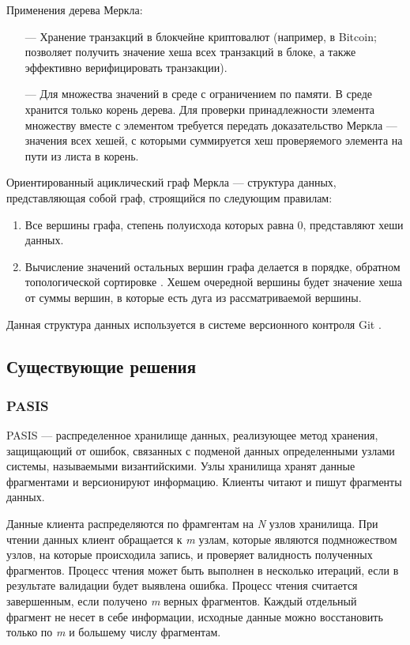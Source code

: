 Применения дерева Меркла:
\begin{itemize}
	\item[---] Хранение транзакций в блокчейне криптовалют (например, в Bitcoin; позволяет получить значение хеша всех транзакций в блоке, а также эффективно верифицировать транзакции).
	\item[---] Для множества значений в среде с ограничением по памяти. В среде хранится только корень дерева. Для проверки принадлежности элемента множеству вместе с элементом требуется передать доказательство Меркла --- значения всех хешей, с которыми суммируется хеш проверяемого элемента на пути из листа в корень.
\end{itemize}

Ориентированный ациклический граф Меркла \cite{merkledag} --- структура данных, представляющая собой граф, строящийся по следующим правилам:
\begin{enumerate}
	\item Все вершины графа, степень полуисхода \cite{graphs} которых равна 0, представляют хеши данных.
	\item Вычисление значений остальных вершин графа делается в порядке, обратном топологической сортировке \cite{topsort}. Хешем очередной вершины будет значение хеша от суммы вершин, в которые есть дуга из рассматриваемой вершины.
\end{enumerate}

%
Данная структура данных используется в системе версионного контроля Git \cite{git}.

\subsection{Существующие решения}

\label{par:mainanal}

\subsubsection{PASIS}

\label{par:pasis}

PASIS \cite{pasis} --- распределенное хранилище данных, реализующее метод хранения, защищающий от ошибок, связанных с подменой данных определенными узлами системы, называемыми византийскими. Узлы хранилища хранят данные фрагментами и версионируют информацию. Клиенты читают и пишут фрагменты данных.

Данные клиента распределяются по фрамгентам на \textit{N} узлов хранилища. При чтении данных клиент обращается к \textit{m} узлам, которые являются подмножеством узлов, на которые происходила запись, и проверяет валидность полученных фрагментов. Процесс чтения может быть выполнен в несколько итераций, если в результате валидации будет выявлена ошибка. Процесс чтения считается завершенным, если получено \textit{m} верных фрагментов. Каждый отдельный фрагмент не несет в себе информации, исходные данные можно восстановить только по \textit{m} и большему числу фрагментам.


